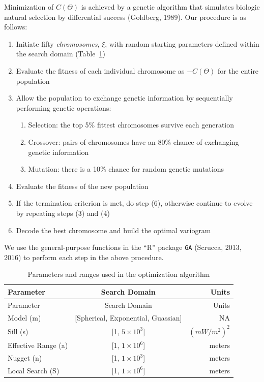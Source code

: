 \documentclass[draft,linenumbers]{agujournal2018}
\begin{document}
Minimization of \(C(\Theta)\) is achieved by a genetic algorithm that
simulates biologic natural selection by differential success (Goldberg,
1989). Our procedure is as follows:

\begin{enumerate}
\def\labelenumi{\arabic{enumi}.}
\item
  Initiate fifty \emph{chromosomes}, \(\xi\), with random starting
  parameters defined within the search domain (Table~\ref{tbl:search})
\item
  Evaluate the fitness of each individual chromosome as \(-C(\Theta)\)
  for the entire population
\item
  Allow the population to exchange genetic information by sequentially
  performing genetic operations:

  \begin{enumerate}
  \def\labelenumii{\alph{enumii}.}
  \item
    Selection: the top 5\% fittest chromosomes survive each generation
  \item
    Crossover: pairs of chromosomes have an 80\% chance of exchanging
    genetic information
  \item
    Mutation: there is a 10\% chance for random genetic mutations
  \end{enumerate}
\item
  Evaluate the fitness of the new population
\item
  If the termination criterion is met, do step (6), otherwise continue
  to evolve by repeating steps (3) and (4)
\item
  Decode the best chromosome and build the optimal variogram
\end{enumerate}

We use the general-purpose functions in the ``R'' package \texttt{GA}
(Scrucca, 2013, 2016) to perform each step in the above procedure.

\hypertarget{tbl:search}{}
\begin{longtable}[]{@{}lcr@{}}
\caption{\label{tbl:search}Parameters and ranges used in the
optimization algorithm}\tabularnewline
\toprule
Parameter & Search Domain & Units \\
\midrule
\endfirsthead
\toprule
Parameter & Search Domain & Units \\
\midrule
\endhead
Model (m) & {[}Spherical, Exponential, Guassian{]} & NA \\
Sill (s) & {[}1, \(5\times 10^3\){]} & \(\left(mW/m^2\right)^2\) \\
Effective Range (a) & {[}1, \(1\times 10^6\){]} & meters \\
Nugget (n) & {[}1, \(1\times 10^3\){]} & meters \\
Local Search (S) & {[}1, \(1\times 10^6\){]} & meters \\
\bottomrule
\end{longtable}
\end{document}
